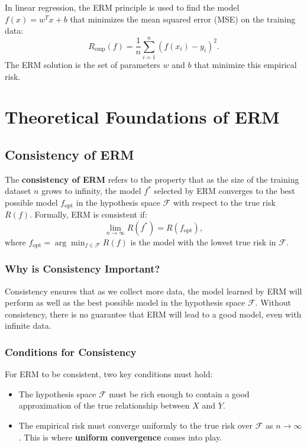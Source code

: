 \begin{notechapter}
In linear regression, the ERM principle is used to find the model \( f(x) = w^T x + b \) that minimizes the mean squared error (MSE) on the training data:
\[
R_{\text{emp}}(f) = \frac{1}{n} \sum_{i=1}^n (f(x_i) - y_i)^2.
\]
The ERM solution is the set of parameters \( w \) and \( b \) that minimize this empirical risk.

\section{Theoretical Foundations of ERM}

\subsection{Consistency of ERM}

The \textbf{consistency of ERM} refers to the property that as the size of the training dataset \( n \) grows to infinity, the model \( f^* \) selected by ERM converges to the best possible model \( f_{\text{opt}} \) in the hypothesis space \( \mathcal{F} \) with respect to the true risk \( R(f) \). Formally, ERM is consistent if:
\[
\lim_{n \to \infty} R(f^*) = R(f_{\text{opt}}),
\]
where \( f_{\text{opt}} = \arg\min_{f \in \mathcal{F}} R(f) \) is the model with the lowest true risk in \( \mathcal{F} \).

\subsubsection{Why is Consistency Important?}
Consistency ensures that as we collect more data, the model learned by ERM will perform as well as the best possible model in the hypothesis space \( \mathcal{F} \). Without consistency, there is no guarantee that ERM will lead to a good model, even with infinite data.

\subsubsection{Conditions for Consistency}
For ERM to be consistent, two key conditions must hold:
\begin{itemize}
    \item The hypothesis space \( \mathcal{F} \) must be rich enough to contain a good approximation of the true relationship between \( X \) and \( Y \).
    \item The empirical risk must converge uniformly to the true risk over \( \mathcal{F} \) as \( n \to \infty \). This is where \textbf{uniform convergence} comes into play.
\end{itemize}


\end{notechapter}
